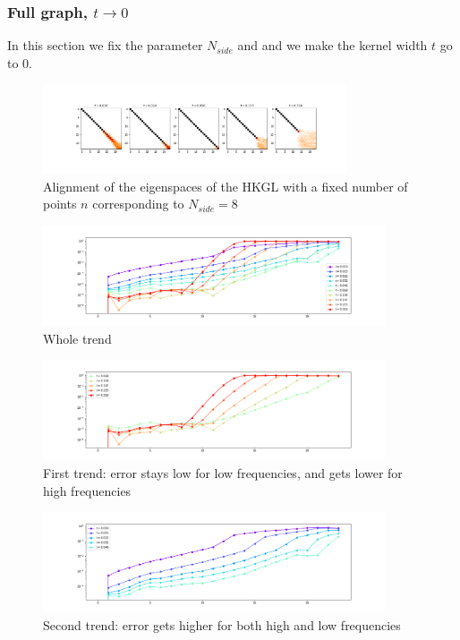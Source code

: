 \subsubsection{Full graph, $t\to 0$}
In this section we fix the parameter $N_{side}$ and and we make the kernel width $t$ go to $0$. 
\begin{figure}[h]
	\centering
	\includegraphics[width=0.8\textwidth]{../codes/02.HeatKernelGraphLaplacian/HEALPix/06_figures/t_sensitivity}
	\caption{\label{fig:t_sensitivity_eigenspaces}Alignment of the eigenspaces of the HKGL with a fixed number of points $n$ corresponding to $N_{side}=8$}
\end{figure}
\begin{figure}
	\centering
	\includegraphics[width=0.9\textwidth]{../codes/02.HeatKernelGraphLaplacian/HEALPix/06_figures/t_sensitivity_diagonal.png}
	\caption{\label{fig:t_sensitivity_diagonal}Whole trend}
\end{figure}%
\begin{figure}
	\centering
	\includegraphics[width=0.9\textwidth]{../codes/02.HeatKernelGraphLaplacian/HEALPix/06_figures/t_sensitivity_diagonal_2.png}
	\caption{\label{fig:t_sensitivity_diagonal_2}First trend: error stays low for low frequencies, and gets lower for high frequencies}
	\vspace{0.5cm}
\end{figure}
\begin{figure}
	\centering
	\includegraphics[width=0.9\textwidth]{../codes/02.HeatKernelGraphLaplacian/HEALPix/06_figures/t_sensitivity_diagonal_1.png}
	\caption{\label{fig:t_sensitivity_diagonal_1}Second trend: error gets higher for both high and low frequencies}
\end{figure}%
